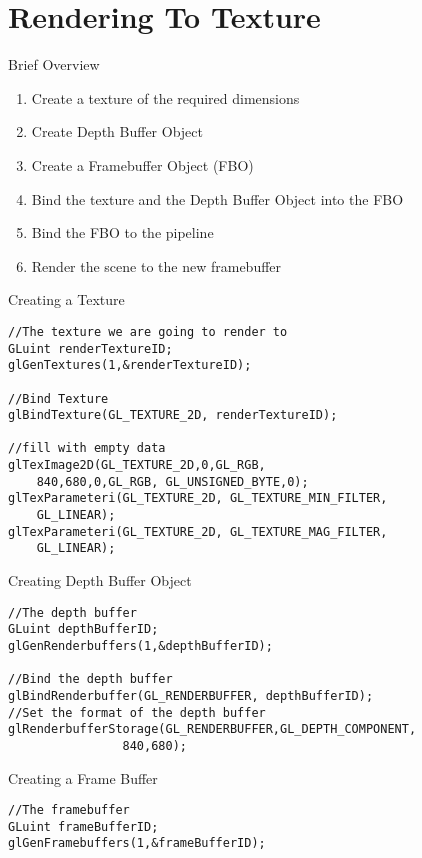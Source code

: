 \part{Rendering To Texture}
\frame{\partpage}

\begin{frame}{Brief Overview}
	\begin{enumerate}
		\item\pause Create a texture of the required dimensions
		\item\pause Create Depth Buffer Object
		\item\pause Create a Framebuffer Object (FBO)
		\item\pause Bind the texture and the Depth Buffer Object into the FBO
		\item\pause Bind the FBO to the pipeline
		\item\pause Render the scene to the new framebuffer
	\end{enumerate}
\end{frame}

\begin{frame}[fragile]{Creating a Texture}
	\begin{lstlisting}
//The texture we are going to render to
GLuint renderTextureID;
glGenTextures(1,&renderTextureID);

//Bind Texture
glBindTexture(GL_TEXTURE_2D, renderTextureID);

//fill with empty data
glTexImage2D(GL_TEXTURE_2D,0,GL_RGB,
	840,680,0,GL_RGB, GL_UNSIGNED_BYTE,0);
glTexParameteri(GL_TEXTURE_2D, GL_TEXTURE_MIN_FILTER,
	GL_LINEAR);
glTexParameteri(GL_TEXTURE_2D, GL_TEXTURE_MAG_FILTER,
	GL_LINEAR);
	\end{lstlisting}
\end{frame}

\begin{frame}[fragile]{Creating Depth Buffer Object}
	\begin{lstlisting}
//The depth buffer
GLuint depthBufferID;
glGenRenderbuffers(1,&depthBufferID);

//Bind the depth buffer
glBindRenderbuffer(GL_RENDERBUFFER, depthBufferID);
//Set the format of the depth buffer
glRenderbufferStorage(GL_RENDERBUFFER,GL_DEPTH_COMPONENT,
				840,680);
	\end{lstlisting}
\end{frame}

\begin{frame}[fragile]{Creating a Frame Buffer}
	\begin{lstlisting}
//The framebuffer
GLuint frameBufferID;
glGenFramebuffers(1,&frameBufferID);
	\end{lstlisting}
\end{frame}

